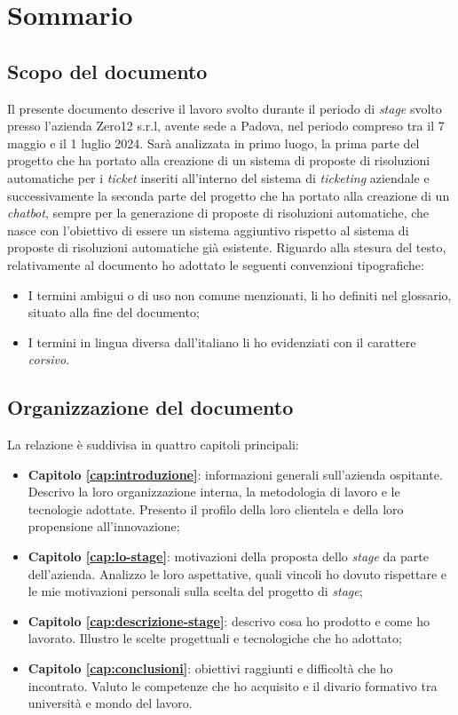 \cleardoublepage
{}
{}
\begingroup
\let\clearpage\relax
\let\cleardoublepage\relax
\let\cleardoublepage\relax
\chapter*{Sommario}
\section*{Scopo del documento}
Il presente documento descrive il lavoro svolto durante il periodo di \textit{stage} svolto presso l'azienda Zero12 s.r.l, avente sede a Padova, nel periodo compreso tra il 7 maggio e il 1 luglio 2024.
Sarà analizzata in primo luogo, la prima parte del progetto che ha portato alla creazione di un sistema di proposte di risoluzioni automatiche per i \textit{ticket} inseriti all'interno del sistema di \textit{ticketing} aziendale e successivamente
la seconda parte del progetto che ha portato alla creazione di un \textit{chatbot}, sempre per la generazione di proposte di risoluzioni automatiche, che nasce con l'obiettivo di essere un sistema aggiuntivo rispetto al sistema di proposte di risoluzioni automatiche già esistente.
Riguardo alla stesura del testo, relativamente al documento ho adottato le seguenti convenzioni tipografiche:
\begin{itemize}
    \item I termini ambigui o di uso non comune menzionati, li ho definiti nel glossario, situato alla fine del documento;
    \item I termini in lingua diversa dall'italiano li ho evidenziati con il carattere \emph{corsivo}.
\end{itemize}

{}
\section*{Organizzazione del documento}
La relazione è suddivisa in quattro capitoli principali:
\begin{itemize}
    \item \textbf{Capitolo \ref{cap:introduzione}}: informazioni generali sull'azienda ospitante. Descrivo la loro organizzazione interna, la metodologia di lavoro e le tecnologie adottate. Presento il profilo della loro clientela e della loro propensione all'innovazione;
    \item \textbf{Capitolo \ref{cap:lo-stage}}: motivazioni della proposta dello \textit{stage} da parte dell'azienda. Analizzo le loro aspettative, quali vincoli ho dovuto rispettare e le mie motivazioni personali sulla scelta del progetto di \textit{stage};
    \item \textbf{Capitolo \ref{cap:descrizione-stage}}: descrivo cosa ho prodotto e come ho lavorato. Illustro le scelte progettuali e tecnologiche che ho adottato;
    \item \textbf{Capitolo \ref{cap:conclusioni}}: obiettivi raggiunti e difficoltà che ho incontrato. Valuto le competenze che ho acquisito e il divario formativo tra università e mondo del lavoro.
\end{itemize}


